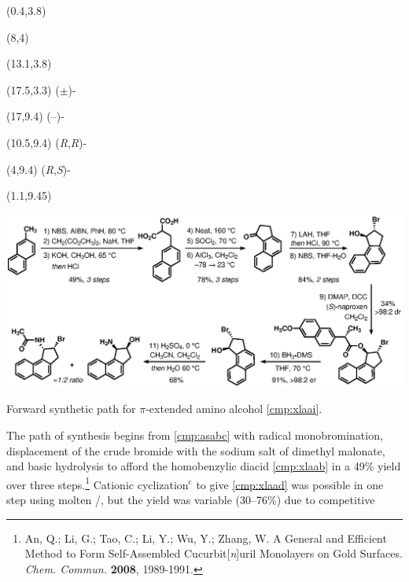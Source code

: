 \begin{Scheme}[t]
  \centering
  \begin{textblock}{1}(0.4,3.8)  \end{textblock}
  \begin{textblock}{1}(8,4)  \end{textblock}
  \begin{textblock}{1}(13.1,3.8)  \end{textblock}
  \begin{textblock}{3}(17.5,3.3) \textsf{\scriptsize{($\pm$)-}} \end{textblock}
  \begin{textblock}{3}(17,9.4) \textsf{\scriptsize{(--)-}} \end{textblock}
  \begin{textblock}{3}(10.5,9.4) \textsf{\scriptsize{(\textit{R},\textit{R})-}}
  \end{textblock}
  \begin{textblock}{3}(4,9.4) \textsf{\scriptsize{(\textit{R},\textit{S})-}}
  \end{textblock}
  \begin{textblock}{1}(1.1,9.45)  \end{textblock}
  \includegraphics[scale=0.8]{chp_asymmetric/images/tlligandone}
  \vspace{5pt}
  \caption{Forward synthetic path for $\pi$-extended amino alcohol \ref{cmp:xlaai}.}
  \label{sch:astlligandone}
\end{Scheme}
The path of synthesis begins from \ref{cmp:asabc} with radical monobromination, displacement of the
crude bromide with the sodium salt of dimethyl malonate, and basic hydrolysis to afford the
homobenzylic diacid \ref{cmp:xlaab} in a 49\% yield over three steps.\footnote{{\frenchspacing An,
Q.; Li, G.; Tao, C.; Li, Y.; Wu, Y.; Zhang, W. A General and Efficient Method to Form Self-Assembled
Cucurbit[\textit{n}]uril Monolayers on Gold Surfaces. \textit{Chem. Commun.} \textbf{2008}, 1989-1991.}} Cationic cyclization$^\mathrm{c}$ to give \ref{cmp:xlaad} was possible in one step using molten /, but the yield was variable (30--76\%) due to competitive
